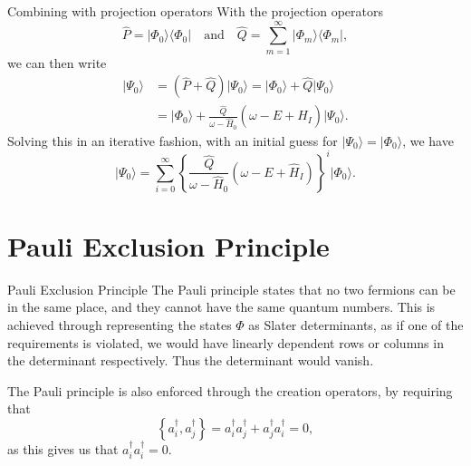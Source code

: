 \documentclass[UKenglish,aspectratio=169]{beamer}
\begin{document}
\begin{frame}{Combining with projection operators}
    With the projection operators
    \begin{equation}
        \hat{P} = \lvert \Phi_0 \rangle \langle \Phi_0 \rvert
        \quad \text{and} \quad
        \hat{Q} = \sum_{m = 1}^\infty \lvert \Phi_m \rangle \langle \Phi_m \rvert,
    \end{equation}
    we can then write
    \begin{equation}
        \begin{split}
            \lvert \Psi_0 \rangle
            &= \left( \hat{P} + \hat{Q} \right) \lvert \Psi_0 \rangle
            = \vert \Phi_0 \rangle + \hat{Q} \lvert \Psi_0 \rangle \\
            &= \vert \Phi_0 \rangle + \frac{\hat{Q}}{\omega - \hat{H}_0} \left( \omega - E + \hat{H}_I \right) \lvert \Psi_0 \rangle.
        \end{split}
    \end{equation}
    Solving this in an iterative fashion, with an initial guess for $\lvert \Psi_0 \rangle = \lvert \Phi_0 \rangle$, we have
    \begin{equation}
        \vert \Psi_0 \rangle = \sum_{i = 0}^\infty \left\{
            \frac{\hat{Q}}{\omega - \hat{H}_0} \left( \omega - E + \hat{H}_I \right)
        \right\}^{i} \lvert \Phi_0 \rangle.
    \end{equation}
\end{frame}

\section{Pauli Exclusion Principle}

\begin{frame}{Pauli Exclusion Principle}
    The Pauli principle states that no two fermions can be in the same place, and they cannot have the same quantum numbers.
    This is achieved through representing the states $\Phi$ as Slater determinants, as if one of the requirements is violated, we would have linearly dependent rows or columns in the determinant respectively.
    Thus the determinant would vanish.

    \medskip

    The Pauli principle is also enforced through the creation operators, by requiring that
    \begin{equation}
        \left\{ a_i^\dagger, a_j^\dagger \right\} = a_i^\dagger a_j^\dagger + a_j^\dagger a_i^\dagger = 0,
    \end{equation}
    as this gives us that $a_i^\dagger a_i^\dagger = 0$.
\end{frame}
\end{document}
